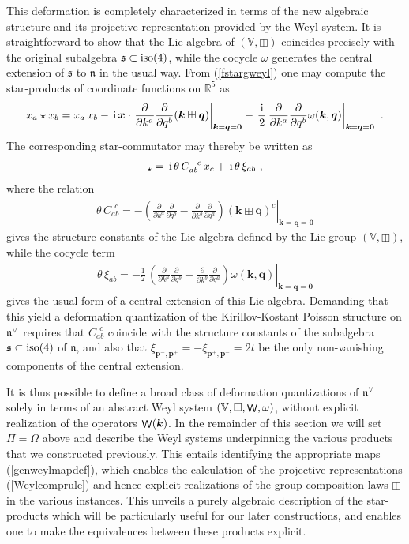 \documentclass[11pt,a4paper]{article}
\DeclareMathOperator{\weyl}{{\sf W}}                   %
\newcommand{\comp}{\boxplus}                            %
\def\d{\partial}
\newcommand{\1}{\mathbb{1}}
\newcommand{\mbf}[1]{{\boldsymbol {#1} }}
\def\ii{{\,{\rm i}\,}}
\def\mx{{\mbf x}}
\def\mk{{\mbf k}}
\def\mq{{\mbf q}}
\def\mbp{{\mbf p}}
\def\mfn{{\mathfrak n}}
\def\mfs{{\mathfrak s}}
\def\mbbV{{\mathbb V}}
\newcommand{\real}{{\mathbb R}} %
\def\d{\partial}
\newcommand{\beq}{\begin{eqnarray}}
\newcommand{\eeq}{\end{eqnarray}}
\begin{document}
This deformation is completely characterized in terms of the
new algebraic structure and its projective representation provided by
the Weyl system. It is straightforward to show
that the Lie algebra of $(\mathbb{V},\comp)$ coincides precisely with
the original subalgebra $\mfs\subset{\rm iso}(4)$, while the cocycle $\omega$
generates the central extension of $\mfs$ to $\mfn$ in the
usual way. From (\ref{fstargweyl}) one may compute the
star-products of coordinate functions on $\real^5$ as
\beq
x_a\star x_b=x_a\,x_b-\ii\mx\cdot\left.\frac\d{\d k^a}\frac\d
{\d q^b}(\mk\comp\mq)\right|_{\mk=\mq=\mbf0}-\left.\frac\ii2\,
\frac\d{\d k^a}\frac\d
{\d q^b}\omega(\mk,\mq)\right|_{\mk=\mq=\mbf0} \ .
\label{xastarxbweyl}\eeq
The corresponding star-commutator may thereby be written as
\beq
[x_a,x_b]_\star=\ii\theta\,C_{ab}^{~~c}\,x_c+\ii\theta\,\xi_{ab} \ ,
\label{xaxbstarcommxi}\eeq
where the relation
\beq
\theta\,C_{ab}^{~~c}=-\left.\left(\frac\d{\d k^a}\frac\d
{\d q^b}-\frac\d{\d k^b}\frac\d
{\d q^a}\right)(\mk\comp\mq)^c\right|_{\mk=\mq=\mbf0}
\label{Cabccomp}\eeq
gives the structure constants of the Lie algebra defined by the Lie
group $(\mathbb{V},\comp)$, while the cocycle term
\beq
\theta\,\xi_{ab}=-\frac12\,\left.\left(\frac\d{\d k^a}\frac\d
{\d q^b}-\frac\d{\d k^b}\frac\d
{\d q^a}\right)\omega(\mk,\mq)\right|_{\mk=\mq=\mbf0}
\label{cocycleterm}\eeq
gives the usual form of a central extension of this Lie
algebra. Demanding that this yield a deformation quantization of the
Kirillov-Kostant Poisson structure on $\mfn^{\vee\,}$ requires that
$C_{ab}^{~~c}$ coincide with the structure constants of the subalgebra
$\mfs\subset{\rm iso}(4)$ of $\mfn$, and also that
$\xi_{\mbp^-,\mbp^+}=-\xi_{\mbp^+,\mbp^-}=2t$ be the only
non-vanishing components of the central extension.

It is thus possible to define a broad class of deformation quantizations of
$\mfn^{\vee\,}$ solely in terms of an abstract Weyl system
$(\mbbV,\comp,\weyl,\omega)$, without explicit realization of the
operators $\weyl(\mk)$. In the remainder of this section we will
set $\Pi=\Omega$ above and describe the Weyl systems
underpinning the various products that we constructed previously. This
entails identifying the appropriate maps (\ref{genweylmapdef}), which
enables the calculation of the projective representations
(\ref{Weylcomprule}) and hence explicit realizations of the group
composition laws $\comp$ in the various instances. This unveils a
purely algebraic description of the star-products which will be
particularly useful for our later constructions, and enables one to
make the equivalences between these products explicit.
\end{document}
